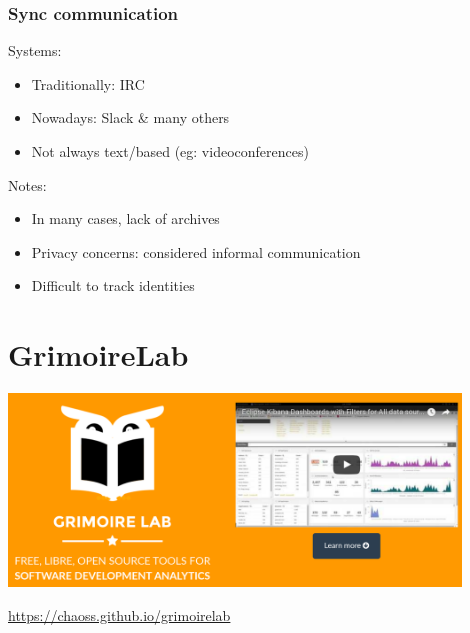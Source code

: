 \documentclass[17pt,aspectratio=169,hyperref=pdfusetitle]{beamer}
\begin{document}
\begin{frame}
\frametitle{Sync communication}

  Systems:

  \begin{itemize}
  \item Traditionally: IRC
  \item Nowadays: Slack \& many others
  \item Not always text/based (eg: videoconferences)
  \end{itemize}
  
  Notes:
  
  \begin{itemize}
  \item In many cases, lack of archives
  \item Privacy concerns: considered informal communication
  \item Difficult to track identities
  \end{itemize}
\end{frame}

\section{GrimoireLab}





\begin{frame}


  \includegraphics[width=12cm]{figs/grimoirelab}

  \begin{flushright}
  \url{https://chaoss.github.io/grimoirelab}
  \end{flushright}

\end{frame}
\end{document}
